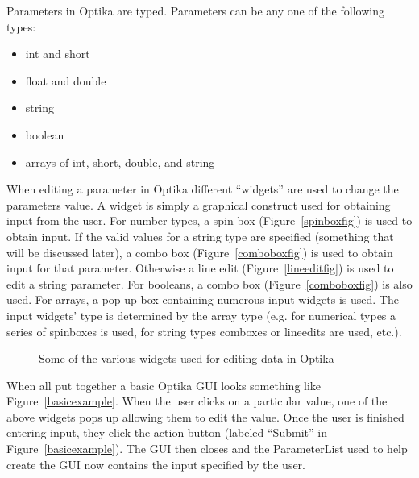 Parameters in Optika are typed. Parameters can be any one of the following types:
	\begin{itemize}
		\item int and short
		\item float and double
		\item string
		\item boolean
		\item arrays of int, short, double, and string
	\end{itemize}
When editing a parameter in Optika different ``widgets'' are used to change the parameters value. A widget is simply
a graphical construct used for obtaining input from the user. For number types, a spin box (Figure~\ref{spinboxfig}) is used to obtain input. 
If the valid values for a string type are specified (something that will be discussed later), a combo box (Figure~\ref{comboboxfig}) is used to obtain
input for that parameter.
Otherwise a line edit (Figure~\ref{lineeditfig}) is used to edit a string parameter. For booleans, a combo box (Figure~\ref{comboboxfig}) 
is also used. For arrays, a pop-up box containing numerous input widgets is used. The input widgets' type is determined by the
array type (e.g. for numerical types a series of spinboxes is used, for string types comboxes or lineedits are used, etc.). 

\begin{figure}
	\centering
	\caption{Some of the various widgets used for editing data in Optika~\cite{QtGallery}}
	\label{editingWidgets}
\end{figure}

When all put together a basic Optika GUI looks something like Figure~\ref{basicexample}.
When the user clicks on a particular value, one of the above widgets pops up allowing them to edit the value.
Once the user is finished entering input, they click the action button (labeled ``Submit'' in Figure~\ref{basicexample}).
The GUI then closes and the ParameterList used to help create the GUI now contains the input specified by the user.


